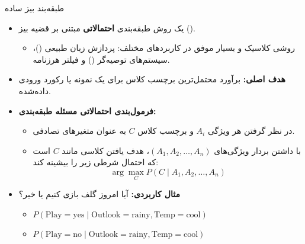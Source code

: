 \begin{frame}{طبقه‌بند بیز ساده}{}
  \begin{itemize}
    \setlength{\itemsep}{7pt}
    \item یک روش طبقه‌بندی \textbf{احتمالاتی} مبتنی بر قضیه بیز ().
    \begin{itemize}
      \item روشی کلاسیک و بسیار موفق در کاربردهای مختلف: پردازش زبان طبیعی ()، سیستم‌های توصیه‌گر () و فیلتر هرزنامه.
    \end{itemize}
    \item \textbf{هدف اصلی:} برآورد محتمل‌ترین برچسب کلاس برای یک نمونه یا رکورد ورودی داده‌شده.
    \item \textbf{فرمول‌بندی احتمالاتی مسئله طبقه‌بندی:}
    \begin{itemize}
      \item در نظر گرفتن هر ویژگی $A_i$ و برچسب کلاس $C$ به عنوان متغیرهای تصادفی.
      \item با داشتن بردار ویژگی‌های $(A_1, A_2, \dots, A_n)$، هدف یافتن کلاسی مانند $C$ است که احتمال شرطی زیر را بیشینه کند:
      \[
        \arg\max_C P(C \mid A_1, A_2, \dots, A_n)
      \]
    \end{itemize}
    \item \textbf{مثال کاربردی:} آیا امروز گلف بازی کنیم یا خیر؟
    \begin{itemize}
      \item $P(\text{Play}=\text{yes} \mid \text{Outlook}=\text{rainy}, \text{Temp}=\text{cool})$
      \item $P(\text{Play}=\text{no} \mid \text{Outlook}=\text{rainy}, \text{Temp}=\text{cool})$
    \end{itemize}
  \end{itemize}
\end{frame}

